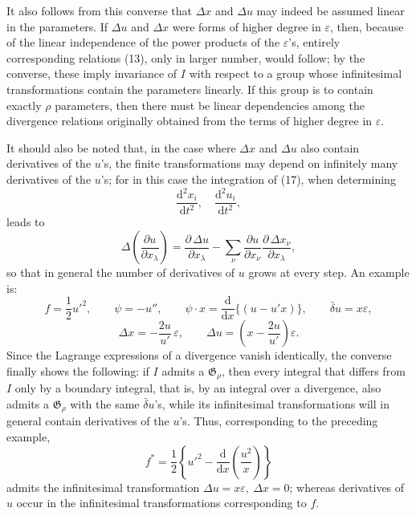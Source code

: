 \documentclass[11pt]{article}
\newcommand{\D}{\Delta}
\providecommand{\eps}{\varepsilon}
\providecommand{\dd}{\mathrm d}
\providecommand{\G}{\mathfrak G}
\providecommand{\bd}{\bar{\delta}}
\providecommand{\p}{\partial}
\providecommand{\p}{\partial}
\providecommand{\dd}{\mathrm d}
\begin{document}
It also follows from this converse that \(\D x\) and \(\D u\) may indeed be assumed linear in the parameters. If \(\D u\) and \(\D x\) were forms of higher degree in \(\eps\), then, because of the linear independence of the power products of the \(\eps\)'s, entirely corresponding relations (13), only in larger number, would follow; by the converse, these imply invariance of \(I\) with respect to a group whose infinitesimal transformations contain the parameters linearly. If this group is to contain exactly \(\rho\) parameters, then there must be linear dependencies among the divergence relations originally obtained from the terms of higher degree in \(\eps\).

It should also be noted that, in the case where \(\D x\) and \(\D u\) also contain derivatives of the \(u\)'s, the finite transformations may depend on infinitely many derivatives of the \(u\)'s; for in this case the integration of (17), when determining
\[
\frac{\dd^2x_i}{\dd t^2},\quad \frac{\dd^2u_i}{\dd t^2},
\]
leads to
\[
\D\!\left(\frac{\p u}{\p x_\lambda}\right)
=\frac{\p\,\D u}{\p x_\lambda}
-\sum_\nu\frac{\p u}{\p x_\nu}
\frac{\p\,\D x_\nu}{\p x_\lambda},
\]
so that in general the number of derivatives of \(u\) grows at every step. An example is:
\[
f=\frac12 u'^2,\qquad
\psi=-u'',\qquad
\psi\cdot x=\frac{\dd}{\dd x}\{(u-u'x)\},\qquad
\bd u=x\eps,
\]
\[
\D x=-\frac{2u}{u'}\,\eps,\qquad
\D u=\left(x-\frac{2u}{u'}\right)\eps.
\]
Since the Lagrange expressions of a divergence vanish identically, the converse finally shows the following: if \(I\) admits a \(\G_\rho\), then every integral that differs from \(I\) only by a boundary integral, that is, by an integral over a divergence, also admits a \(\G_\rho\) with the same \(\bd u\)'s, while its infinitesimal transformations will in general contain derivatives of the \(u\)'s. Thus, corresponding to the preceding example,
\[
f^*=\frac12\left\{u'^2-\frac{\dd}{\dd x}\left(\frac{u^2}{x}\right)\right\}
\]
admits the infinitesimal transformation \(\D u=x\eps,\ \D x=0\); whereas derivatives of \(u\) occur in the infinitesimal transformations corresponding to \(f\).
\end{document}
